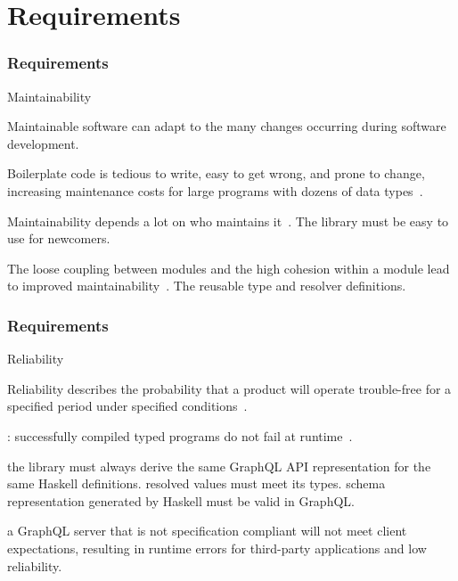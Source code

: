 \section{Requirements}

\begin{frame}\frametitle{Requirements}  

\begin{alertblock}{Maintainability}

Maintainable software can adapt to the many changes occurring during software development.~\cite{requirements-change-1,view-of-web, sof-sus-institute-maintainability}


\begin{itemize}

     Boilerplate code is tedious to write, easy to get wrong, and prone to change, increasing maintenance costs for large programs with dozens of data types~\cite{scrap-your-boilerplate}.

     Maintainability depends a lot on who maintains it~\cite{contr-reduce-maintainability}. The library must be easy to use for newcomers.

    The loose coupling between modules and the high cohesion within a module lead to improved maintainability~\cite{arc-modularity}.
    The reusable type and resolver definitions. 
    
\end{itemize}
\end{alertblock}
\end{frame}

\begin{frame}\frametitle{Requirements}  

\begin{alertblock}{Reliability}

Reliability describes the probability that a product will operate trouble-free for a specified period under specified conditions~\cite{optimal-release-time}.

\begin{itemize}
    : successfully compiled typed programs do not fail at runtime~\cite{milner-well-typed,wadler-well-typed}.  
    \begin{itemize}
         the library must always derive the same GraphQL API representation for the same Haskell definitions. 
         resolved values must meet its types. 
         schema representation generated by Haskell must be valid in GraphQL.
    \end{itemize}

     a GraphQL server that is not specification compliant will not meet client expectations, resulting in runtime errors for third-party applications and low reliability.

\end{itemize}
\end{alertblock}
\end{frame}

